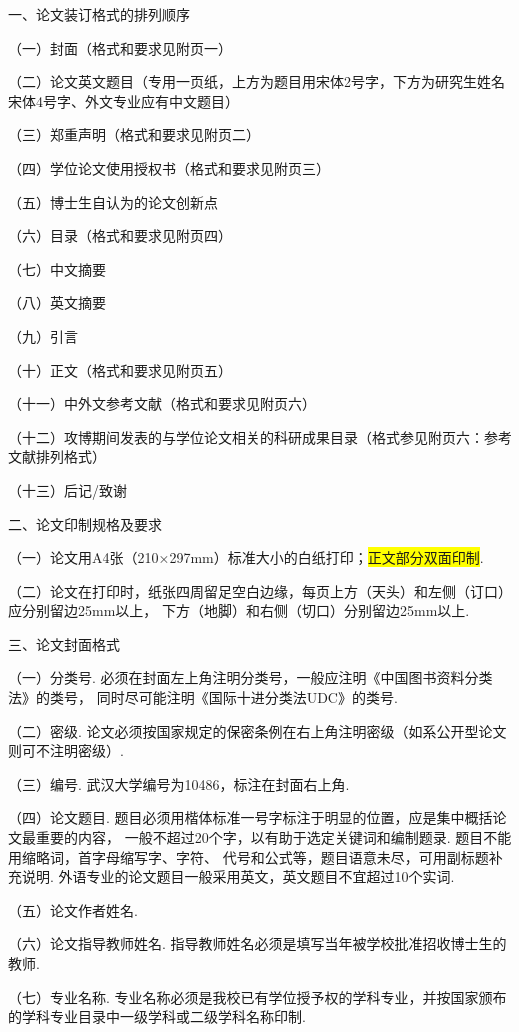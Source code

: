 \documentclass{ice_report}  %
\begin{document}
{\heiti 一、论文装订格式的排列顺序}

（一）封面（格式和要求见附页一）

（二）论文英文题目（专用一页纸，上方为题目用宋体2号字，下方为研究生姓名宋体4号字、外文专业应有中文题目）

（三）郑重声明（格式和要求见附页二）

（四）学位论文使用授权书（格式和要求见附页三）

（五）博士生自认为的论文创新点

（六）目录（格式和要求见附页四）

（七）中文摘要

（八）英文摘要

（九）引言

（十）正文（格式和要求见附页五）

（十一）中外文参考文献（格式和要求见附页六）

（十二）攻博期间发表的与学位论文相关的科研成果目录（格式参见附页六：参考文献排列格式）

（十三）后记/致谢

{\heiti 二、论文印制规格及要求}

（一）论文用A4张（210×297mm）标准大小的白纸打印；\colorbox{yellow}{正文部分双面印制}.

（二）论文在打印时，纸张四周留足空白边缘，每页上方（天头）和左侧（订口）应分别留边25mm以上，
下方（地脚）和右侧（切口）分别留边25mm以上.

{\heiti 三、论文封面格式}

（一）分类号. 必须在封面左上角注明分类号，一般应注明《中国图书资料分类法》的类号，
同时尽可能注明《国际十进分类法UDC》的类号.

（二）密级. 论文必须按国家规定的保密条例在右上角注明密级（如系公开型论文则可不注明密级）.

（三）编号. 武汉大学编号为10486，标注在封面右上角.

（四）论文题目. 题目必须用楷体标准一号字标注于明显的位置，应是集中概括论文最重要的内容，
一般不超过20个字，以有助于选定关键词和编制题录. 题目不能用缩略词，首字母缩写字、字符、
代号和公式等，题目语意未尽，可用副标题补充说明. 外语专业的论文题目一般采用英文，英文题目不宜超过10个实词.

（五）论文作者姓名.

（六）论文指导教师姓名. 指导教师姓名必须是填写当年被学校批准招收博士生的教师.

（七）专业名称. 专业名称必须是我校已有学位授予权的学科专业，并按国家颁布的学科专业目录中一级学科或二级学科名称印制.
\end{document}
